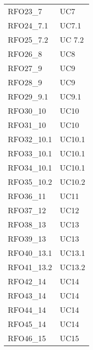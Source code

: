 \begin{longtable}{|C{6cm} C{3cm}|}
    RFO23\_7 & UC7 \\
    
    RFO24\_7.1 & UC7.1 \\
    
    RFO25\_7.2 & UC 7.2 \\
    
    RFO26\_8 & UC8 \\
    
    RFO27\_9 & UC9 \\
    
    RFO28\_9 & UC9 \\

    RFO29\_9.1 & UC9.1 \\
    
    RFO30\_10 & UC10 \\

    RFO31\_10 & UC10 \\
    
    RFO32\_10.1 & UC10.1 \\
    
    RFO33\_10.1 & UC10.1 \\
    
    RFO34\_10.1 & UC10.1 \\
    
    RFO35\_10.2 & UC10.2 \\
    
    RFO36\_11 & UC11 \\
    
    RFO37\_12 & UC12 \\
    
    RFO38\_13 & UC13 \\
    
    RFO39\_13 & UC13 \\
    
    RFO40\_13.1 & UC13.1 \\
    
    RFO41\_13.2 & UC13.2 \\
    
    RFO42\_14 & UC14 \\
    
    RFO43\_14 & UC14 \\
    
    RFO44\_14 & UC14 \\
    
    RFO45\_14 & UC14 \\
    
    RFO46\_15 & UC15 \\
    

\end{longtable}
